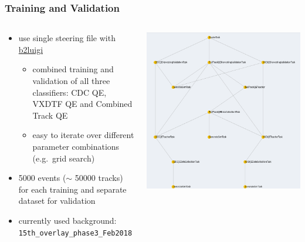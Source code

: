 \documentclass[18pt, aspectratio=169]{beamer}
\begin{document}
\begin{frame}
  \frametitle{Training and Validation}
  \begin{columns}
    \begin{column}{.6\textwidth}
      \begin{itemize}
  \item use single steering file with
    \href{https://github.com/nils-braun/b2luigi}{\textcolor{kit-blue100}{b2luigi}}
    \begin{itemize}
    \item combined training and validation of all three classifiers: CDC QE, VXDTF QE and Combined Track QE
    \item easy to iterate over different parameter combinations (e.g.\ grid search)
    \end{itemize}
  \item \num{5000} events ($\sim$ \num{50000} tracks) for each training and separate dataset for
    validation
  \item currently used background: \texttt{15th\_overlay\_phase3\_Feb2018}
  \end{itemize}
  \end{column}
  \begin{column}{.4\textwidth}
    \centering
    \includegraphics[width=\textwidth]{figures/luigi_task_graph.png}
  \end{column}
\end{columns}    
\end{frame}
\end{document}
